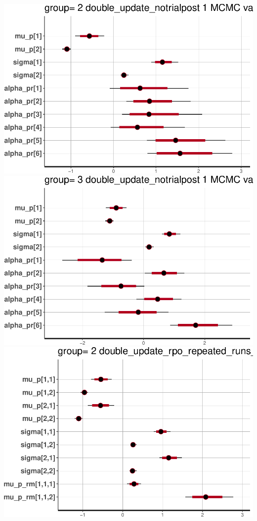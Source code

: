 \documentclass[]{article}
\begin{document}
\includegraphics{compare_vb_and_MCMC_files/figure-latex/StanPlotLogResults-1.pdf}
\includegraphics{compare_vb_and_MCMC_files/figure-latex/StanPlotLogResults-2.pdf}
\includegraphics{compare_vb_and_MCMC_files/figure-latex/StanPlotLogResults-3.pdf}
\end{document}
